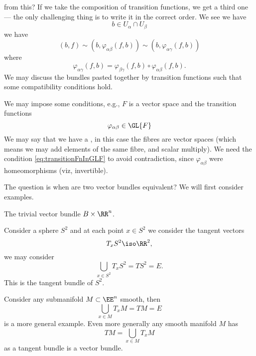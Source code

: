 from this? If we take the composition of transition functions, we
get a third one --- the only challenging thing is to write it in
the correct order. We see we have
\begin{equation}
b\in U_{\alpha}\cap U_{\beta}
\end{equation}
we have
\begin{equation}
(b,f)\sim\left(b,\varphi_{\alpha\beta}(f,b)\right)\sim\left(b,\varphi_{\alpha\gamma}(f,b)\right)
\end{equation}
where
\begin{equation}
\varphi_{\alpha\gamma}(f,b)=\varphi_{\beta\gamma}(f,b)\circ\varphi_{\alpha\beta}(f,b).
\end{equation}
We may discuss the bundles pasted together by transition
functions such that some compatibility conditions hold.

We may impose some conditions, e.g., $F$ is a vector space and
the transition functions 
\begin{equation}\label{eq:transitionFnInGLF}
\varphi_{\alpha\beta}\in\GL{F}
\end{equation}
We may say that we have a , in this case
the fibres are vector spaces (which means we may add elements of
the same fibre, and scalar multiply). We need the condition
\eqref{eq:transitionFnInGLF} to avoid contradiction, since
$\varphi_{\alpha\beta}$ were homeomorphisms (viz, invertible).

The question is when are two vector bundles equivalent? We will
first consider examples.
\begin{ex}
The trivial vector bundle $B\times\RR^{n}$.
\end{ex}
\begin{ex}
Consider a sphere $S^{2}$ and at each point $x\in S^{2}$ we
consider the tangent vectors
\begin{equation}
T_{x}S^{2}\iso\RR^{2},
\end{equation}
we may consider
\begin{equation}
\bigcup_{x\in S^{2}}T_{x}S^{2}=TS^{2}=E.
\end{equation}
This is the tangent bundle of $S^{2}$.
\end{ex}
\begin{ex}
Consider any submanifold $M\subset\EE^{n}$ smooth, then
\begin{equation}
\bigcup_{x\in M} T_{x}M = TM = E
\end{equation}
is a more general example. Even more generally any smooth
manifold $M$ has 
\begin{equation}
TM = \bigcup_{x\in M} T_{x}M
\end{equation}
as a tangent bundle is a vector bundle.
\end{ex}

